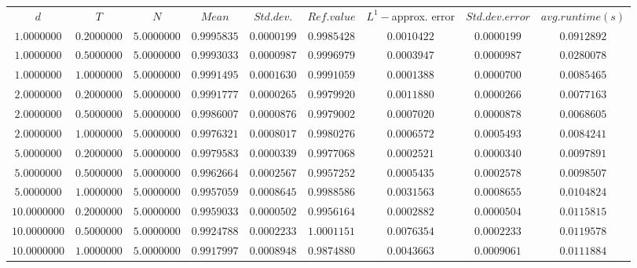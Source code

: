 \begin{tabular}{ccccccccc}
$d$ & $T$ & $N$ & $Mean$ & $Std. dev.$ & $Ref. value$ & $L^1-$approx. error & $Std. dev. error$ & $avg. runtime (s)$\\
$1.0000000$ & $0.2000000$ & $5.0000000$ & $0.9995835$ & $0.0000199$ & $0.9985428$ & $0.0010422$ & $0.0000199$ & $0.0912892$\\
$1.0000000$ & $0.5000000$ & $5.0000000$ & $0.9993033$ & $0.0000987$ & $0.9996979$ & $0.0003947$ & $0.0000987$ & $0.0280078$\\
$1.0000000$ & $1.0000000$ & $5.0000000$ & $0.9991495$ & $0.0001630$ & $0.9991059$ & $0.0001388$ & $0.0000700$ & $0.0085465$\\
$2.0000000$ & $0.2000000$ & $5.0000000$ & $0.9991777$ & $0.0000265$ & $0.9979920$ & $0.0011880$ & $0.0000266$ & $0.0077163$\\
$2.0000000$ & $0.5000000$ & $5.0000000$ & $0.9986007$ & $0.0000876$ & $0.9979002$ & $0.0007020$ & $0.0000878$ & $0.0068605$\\
$2.0000000$ & $1.0000000$ & $5.0000000$ & $0.9976321$ & $0.0008017$ & $0.9980276$ & $0.0006572$ & $0.0005493$ & $0.0084241$\\
$5.0000000$ & $0.2000000$ & $5.0000000$ & $0.9979583$ & $0.0000339$ & $0.9977068$ & $0.0002521$ & $0.0000340$ & $0.0097891$\\
$5.0000000$ & $0.5000000$ & $5.0000000$ & $0.9962664$ & $0.0002567$ & $0.9957252$ & $0.0005435$ & $0.0002578$ & $0.0098507$\\
$5.0000000$ & $1.0000000$ & $5.0000000$ & $0.9957059$ & $0.0008645$ & $0.9988586$ & $0.0031563$ & $0.0008655$ & $0.0104824$\\
$10.0000000$ & $0.2000000$ & $5.0000000$ & $0.9959033$ & $0.0000502$ & $0.9956164$ & $0.0002882$ & $0.0000504$ & $0.0115815$\\
$10.0000000$ & $0.5000000$ & $5.0000000$ & $0.9924788$ & $0.0002233$ & $1.0001151$ & $0.0076354$ & $0.0002233$ & $0.0119578$\\
$10.0000000$ & $1.0000000$ & $5.0000000$ & $0.9917997$ & $0.0008948$ & $0.9874880$ & $0.0043663$ & $0.0009061$ & $0.0111884$\\
\end{tabular}
